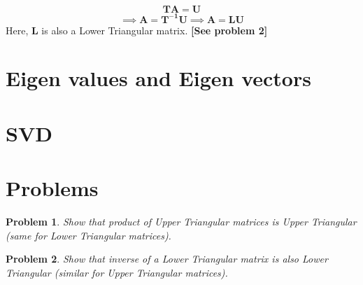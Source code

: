 \documentclass[a4paper]{article}
\newtheorem{problem}{Problem}
\begin{document}
        \begin{equation*}
            \mathbf{TA} = \mathbf{U}
        \end{equation*}
        \begin{equation*}
            \implies \mathbf{A} = \mathbf{T^{-1}U}
            \implies \mathbf{A} = \mathbf{LU}
        \end{equation*}
        Here, $\mathbf{L}$ is also a Lower Triangular matrix. \textbf{[See problem 2]}
        
        
\section{Eigen values and Eigen vectors}

\section{SVD}

\section{Problems}

\begin{problem}
    Show that product of Upper Triangular matrices is Upper Triangular (same for Lower Triangular matrices).
\end{problem}

\begin{problem}
    Show that inverse of a Lower Triangular matrix is also Lower Triangular (similar for Upper Triangular matrices).
\end{problem}
\end{document}
